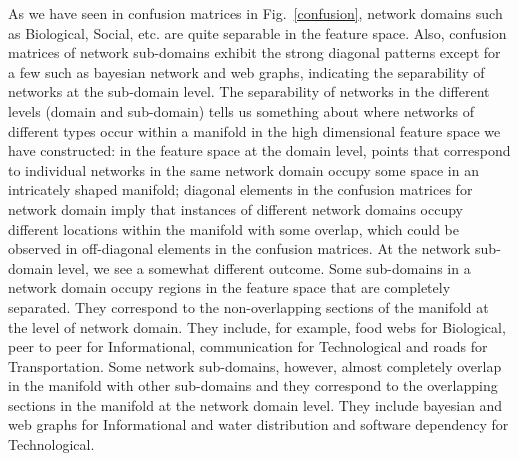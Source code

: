  As we have seen in confusion matrices in Fig.~\ref{confusion}, network domains such as Biological, Social, etc. are quite separable in the feature space. Also, confusion matrices of network sub-domains exhibit the strong diagonal patterns except for a few such as bayesian network and web graphs, indicating the separability of networks at the sub-domain level. The separability of networks in the different levels (domain and sub-domain) tells us something about where networks of different types occur within a manifold in the high dimensional feature space we have constructed: in the feature space at the domain level, points that correspond to individual networks in the same network domain occupy some space in an intricately shaped manifold; diagonal elements in the confusion matrices for network domain imply that instances of different network domains occupy different locations within the manifold with some overlap, which could be observed in off-diagonal elements in the confusion matrices. At the network sub-domain level, we see a somewhat different outcome. Some sub-domains in a network domain occupy regions in the feature space that are completely separated. They correspond to the non-overlapping sections of the manifold at the level of network domain. They include, for example, food webs for Biological, peer to peer for Informational, communication for Technological and roads for Transportation. Some network sub-domains, however, almost completely overlap in the manifold with other sub-domains and they correspond to the overlapping sections in the manifold at the network domain level. They include bayesian and web graphs for Informational and water distribution and software dependency for Technological. 


